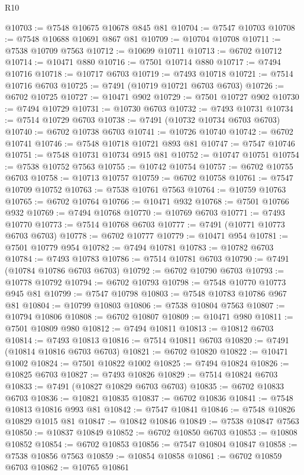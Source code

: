 \begin{lexlean}{R10}
\begin{coremodule}
{{{{{{{{{{{{{{{{{{{{{{{{{{{{{{{{{{{{{{{{{{{{{{{{{{{{{{{{{{{{{{{{{{{{{{{{{{{{{{{{{{{{@10703 := @7548 @10675 @10678 @845 @81
@10704 := @7547 @10703
@10708 := @7548 @10688 @10691 @867 @81
@10709 := @10704 @10708
@10711 := @7538 @10709 @7563
@10712 := @10699 @10711
@10713 := @6702 @10712
@10714 := @10471 @880
@10716 := @7501 @10714 @880
@10717 := @7494 @10716
@10718 := @10717 @6703
@10719 := @7493 @10718
@10721 := @7514 @10716 @6703
@10725 := @7491 (@10719 @10721 @6703 @6703)
@10726 := @6702 @10725
@10727 := @10471 @902
@10729 := @7501 @10727 @902
@10730 := @7494 @10729
@10731 := @10730 @6703
@10732 := @7493 @10731
@10734 := @7514 @10729 @6703
@10738 := @7491 (@10732 @10734 @6703 @6703)
@10740 := @6702 @10738 @6703
@10741 := @10726 @10740
@10742 := @6702 @10741
@10746 := @7548 @10718 @10721 @893 @81
@10747 := @7547 @10746
@10751 := @7548 @10731 @10734 @915 @81
@10752 := @10747 @10751
@10754 := @7538 @10752 @7563
@10755 := @10742 @10754
@10757 := @6702 @10755 @6703
@10758 := @10713 @10757
@10759 := @6702 @10758
@10761 := @7547 @10709 @10752
@10763 := @7538 @10761 @7563
@10764 := @10759 @10763
@10765 := @6702 @10764
@10766 := @10471 @932
@10768 := @7501 @10766 @932
@10769 := @7494 @10768
@10770 := @10769 @6703
@10771 := @7493 @10770
@10773 := @7514 @10768 @6703
@10777 := @7491 (@10771 @10773 @6703 @6703)
@10778 := @6702 @10777
@10779 := @10471 @954
@10781 := @7501 @10779 @954
@10782 := @7494 @10781
@10783 := @10782 @6703
@10784 := @7493 @10783
@10786 := @7514 @10781 @6703
@10790 := @7491 (@10784 @10786 @6703 @6703)
@10792 := @6702 @10790 @6703
@10793 := @10778 @10792
@10794 := @6702 @10793
@10798 := @7548 @10770 @10773 @945 @81
@10799 := @7547 @10798
@10803 := @7548 @10783 @10786 @967 @81
@10804 := @10799 @10803
@10806 := @7538 @10804 @7563
@10807 := @10794 @10806
@10808 := @6702 @10807
@10809 := @10471 @980
@10811 := @7501 @10809 @980
@10812 := @7494 @10811
@10813 := @10812 @6703
@10814 := @7493 @10813
@10816 := @7514 @10811 @6703
@10820 := @7491 (@10814 @10816 @6703 @6703)
@10821 := @6702 @10820
@10822 := @10471 @1002
@10824 := @7501 @10822 @1002
@10825 := @7494 @10824
@10826 := @10825 @6703
@10827 := @7493 @10826
@10829 := @7514 @10824 @6703
@10833 := @7491 (@10827 @10829 @6703 @6703)
@10835 := @6702 @10833 @6703
@10836 := @10821 @10835
@10837 := @6702 @10836
@10841 := @7548 @10813 @10816 @993 @81
@10842 := @7547 @10841
@10846 := @7548 @10826 @10829 @1015 @81
@10847 := @10842 @10846
@10849 := @7538 @10847 @7563
@10850 := @10837 @10849
@10852 := @6702 @10850 @6703
@10853 := @10808 @10852
@10854 := @6702 @10853
@10856 := @7547 @10804 @10847
@10858 := @7538 @10856 @7563
@10859 := @10854 @10858
@10861 := @6702 @10859 @6703
@10862 := @10765 @10861
}}}}}}}}}}}}}}}}}}}}}}}}}}}}}}}}}}}}}}}}}}}}}}}}}}}}}}}}}}}}}}}}}}}}}}}}}}}}}}}}}}}}
\end{coremodule}
\end{lexlean}
